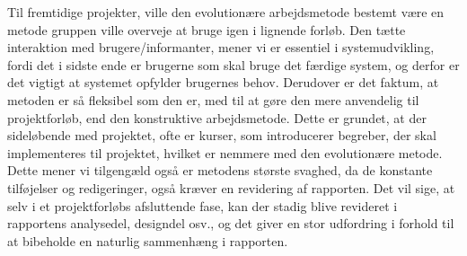 Til fremtidige projekter, ville den evolutionære arbejdsmetode bestemt være en metode gruppen ville overveje at bruge igen i lignende forløb. Den tætte interaktion med brugere/informanter, mener vi er essentiel i systemudvikling, fordi det i sidste ende er brugerne som skal bruge det færdige system, og derfor er det vigtigt at systemet opfylder brugernes behov. Derudover er det faktum, at metoden er så fleksibel som den er, med til at gøre den mere anvendelig til projektforløb, end den konstruktive arbejdsmetode. Dette er grundet, at der sideløbende med projektet, ofte er kurser, som introducerer begreber, der skal implementeres til projektet, hvilket er nemmere med den evolutionære metode. Dette mener vi tilgengæld også er metodens største svaghed, da de konstante tilføjelser og redigeringer, også kræver en revidering af rapporten. Det vil sige, at selv i et projektforløbs afsluttende fase, kan der stadig blive revideret i rapportens analysedel, designdel osv., og det giver en stor udfordring i forhold til at bibeholde en naturlig sammenhæng i rapporten. 



